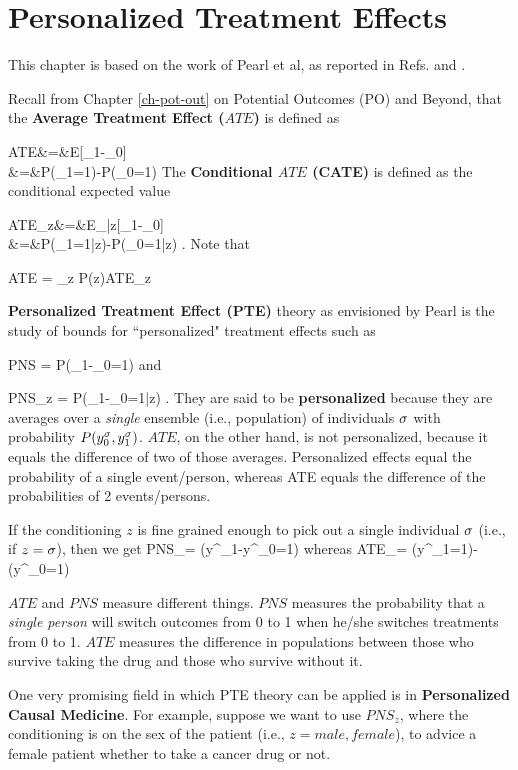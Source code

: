 \chapter{Personalized Treatment Effects}
\label{ch-personalized}


This chapter
is based on the work of Pearl et al, as reported in
Refs.
\cite{pearl-tian-2000} and
\cite{personalized-pearl-2021}.

Recall from Chapter \ref{ch-pot-out}
on Potential Outcomes (PO)
and Beyond, that
the {\bf Average Treatment Effect ($ATE$)}
is defined as

\beqa
ATE&=&E[\rvy_1-\rvy_0]
\\
&=&P(\rvy_1=1)-P(\rvy_0=1)
\eeqa
The {\bf Conditional $ATE$ (CATE) }
is defined as
the conditional expected value

\beqa
ATE_z&=&E_{|z}[\rvy_1-\rvy_0]
\\
&=&P(\rvy_1=1|z)-P(\rvy_0=1|z)
\;.
\eeqa
Note that

\beq ATE = \sum_z  P(z)ATE_z
\eeq

{\bf
Personalized Treatment Effect (PTE)}
theory
as envisioned by Pearl
is the study
of
bounds
for ``personalized"
 treatment
effects such as

\beq
PNS = P(\rvy_1-\rvy_0=1)
\eeq
and

\beq
PNS_z = P(\rvy_1-\rvy_0=1|z)
\;.
\eeq
They are said to be {\bf personalized}
because they are averages
over a {\it single}
ensemble (i.e., population)
of individuals $\sigma$ with probability
 $P(y^\sigma_0, y^\sigma_1)$.
$ATE$, on the other hand, is not
personalized, because it equals the
difference of two of those averages.
Personalized effects equal the probability of a
single event/person, whereas ATE equals the difference of the probabilities of
2 events/persons.


If the conditioning $z$
is fine grained enough
to pick out a single individual
$\sigma$ (i.e., if $z=\sigma$), then
we get
\beq
PNS_\s = \indi(y^\s_1-y^\s_0=1)
\;
\eeq
whereas
\beq
ATE_\s = \indi(y^\s_1=1)-\indi(y^\s_0=1)
\eeq

$ATE$ and $PNS$ measure different things.   $PNS$
measures the probability
that a {\it single person} will switch outcomes from 0 to 1 when he/she
switches treatments from 0 to 1. $ATE$
 measures the difference in
populations between
 those who survive taking the drug and those who
 survive without it.


One
very promising
field in
which PTE theory
can be applied
is in {\bf Personalized Causal Medicine}.
For example, suppose we want to
 use $PNS_z$,
where the conditioning is on the
sex of the patient (i.e., $z=male, female$),
to advice a female  patient
whether to take a cancer drug or not.

